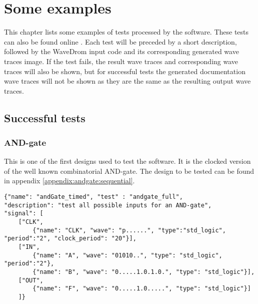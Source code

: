 \section{Some examples}\label{some_examples}
This chapter lists some examples of tests processed by the software. These tests can also be found online \cite{examples}.  Each test will be preceded by a short description, followed by the WaveDrom input code and its corresponding generated wave traces image. If the test fails, the result wave traces and corresponding wave traces will also be shown, but for successful tests the generated documentation wave traces will not be shown as they are the same as the resulting output wave traces.\newpage
\subsection{Successful tests}
\subsubsection{AND-gate}
This is one of the first designs used to test the software. It is the clocked version of the well known combinatorial AND-gate. The  design to be tested can be found in appendix \ref{appendix:andgate:sequential}.
\begin{lstlisting}[style=json, caption={Full functionality test for the timed AND-gate design in appendix \ref{appendix:andgate:sequential}}, label={json:andgatefull_result}]
{"name": "andGate_timed", "test" : "andgate_full", 
"description": "test all possible inputs for an AND-gate", 
"signal": [
	["CLK",
		{"name": "CLK", "wave": "p......", "type":"std_logic", "period":"2", "clock_period": "20"}],
	["IN",
		{"name": "A", "wave": "01010..", "type": "std_logic", "period":"2"},
		{"name": "B", "wave": "0.....1.0.1.0.", "type": "std_logic"}],
	["OUT",
		{"name": "F", "wave": "0.....1.0.....", "type": "std_logic"}]
	]}
\end{lstlisting}
